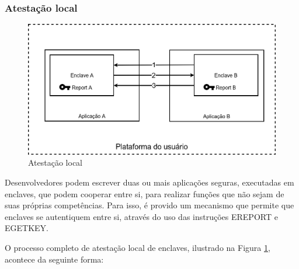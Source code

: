 \subsubsection{Atestação local}
\label{subsubsec:sgx_funcionalidades_atestacao_enclaves_local}

\begin{figure}[ht]
\centering
\includegraphics[width=5in]{img/atestacao_local_pt_BR}
\caption{Atestação local}
\label{fig:atestacaolocal}
\end{figure}

Desenvolvedores podem escrever duas ou mais aplicações seguras, executadas em
enclaves, que podem cooperar entre si, para realizar funções que não sejam de
suas próprias competências. Para isso, é provido um mecanismo que permite que
enclaves se autentiquem entre si, através do uso das instruções EREPORT e
EGETKEY.

O processo completo de atestação local de enclaves, ilustrado na Figura
\ref{fig:atestacaolocal}, acontece da seguinte forma:

